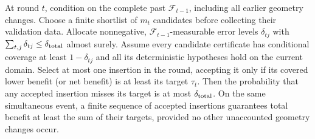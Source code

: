 \begin{proposition}
\label{prop:adaptivebenefit}
At round $t$, condition on the complete past $\mathcal F_{t-1}$, including
all earlier geometry changes. Choose a finite shortlist of $m_t$ candidates
before collecting their validation data. Allocate nonnegative,
$\mathcal F_{t-1}$-measurable error levels $\delta_{tj}$ with
$\sum_{t,j}\delta_{tj}\le\delta_{\rm total}$ almost surely.
Assume every candidate certificate has conditional coverage at least
$1-\delta_{tj}$ and all its deterministic hypotheses hold on the current
domain. Select at most one insertion in the round, accepting it only if
its covered lower benefit (or net benefit) is at least its target $\tau_t$.
Then the probability that any accepted insertion misses its target is at
most $\delta_{\rm total}$. On the same simultaneous event, a finite sequence
of accepted insertions guarantees total benefit at least the sum of their
targets, provided no other unaccounted geometry changes occur.
\end{proposition}
